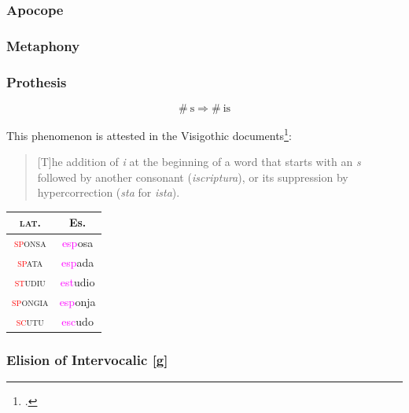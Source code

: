 \documentclass{report}[12pt]
\begin{document}
\subsubsection{Apocope}

\begin{tcolorbox}

\end{tcolorbox}

\subsubsection{Metaphony}

\begin{tcolorbox}

\end{tcolorbox}

\subsubsection{Prothesis}

\begin{tcolorbox}
  \[ \#\ \text{s} \Rightarrow \#\ \text{is} \]
\end{tcolorbox}

This phenomenon is attested in the Visigothic documents\footcite[p.~159]{latin_palaeography}:
\begin{quote}
  [T]he addition of \emph{i} at the beginning of a word that starts with an \emph{s} followed by another consonant (\emph{iscriptura}), or its suppression by hypercorrection (\emph{sta} for \emph{ista}).
\end{quote}

\begin{tabular}{c c}
  \textsc{lat.} & Es. \\
  \hline
  \textsc{\textcolor{red}{sp}onsa} & \textcolor{magenta}{esp}osa \\
  \textsc{\textcolor{red}{sp}ata} & \textcolor{magenta}{esp}ada \\
  \textsc{\textcolor{red}{st}udiu} & \textcolor{magenta}{est}udio \\
  \textsc{\textcolor{red}{sp}ongia} & \textcolor{magenta}{esp}onja \\
  \textsc{\textcolor{red}{sc}utu} & \textcolor{magenta}{esc}udo \\
\end{tabular}

\subsubsection{Elision of Intervocalic [g]}
\end{document}
